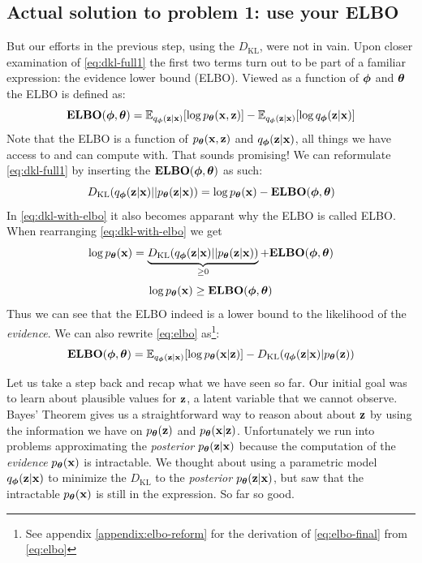 \documentclass[11pt]{article}
\theoremstyle{definition}
\begin{document}
\subsection{Actual solution to problem 1: use your ELBO}
But our efforts in the previous step, using the $D_{\text{KL}}$, were not in vain. Upon closer examination of \autoref{eq:dkl-full1} the first two terms turn out to be part of a familiar expression: the evidence lower bound (ELBO). Viewed as a function of $\boldsymbol{\phi}$ and $\boldsymbol{\theta}$ the ELBO is defined as:
\begin{equation}
	\mathbf{ELBO}(\boldsymbol{\phi}, \boldsymbol{\theta}) = \mathbb{E}_{q_{\boldsymbol{\phi}}(\mathbf{z}|\mathbf{x})}[\log p_{\boldsymbol{\theta}}(\mathbf{x},\mathbf{z})] - \mathbb{E}_{q_{\boldsymbol{\phi}}(\mathbf{z}|\mathbf{x})}[\log q_{\boldsymbol{\phi}}(\mathbf{z}|\mathbf{x})]
	\label{eq:elbo}
\end{equation}
Note that the ELBO is a function of $p_{\boldsymbol{\theta}}(\mathbf{x},\mathbf{z})$ and $q_{\boldsymbol{\phi}}(\mathbf{z}|\mathbf{x})$, all things we have access to and can compute with. That sounds promising! We can reformulate \autoref{eq:dkl-full1} by inserting the $\mathbf{ELBO}(\boldsymbol{\phi}, \boldsymbol{\theta})$ as such:
\begin{equation}
	D_{\text{KL}}(q_{\boldsymbol{\phi}}(\mathbf{z}|\mathbf{x})||p_{\boldsymbol{\theta}}(\mathbf{z}|\mathbf{x})) = \log p_{\boldsymbol{\theta}}(\mathbf{x}) - \mathbf{ELBO}(\boldsymbol{\phi}, \boldsymbol{\theta})
	\label{eq:dkl-with-elbo}
\end{equation}
In \autoref{eq:dkl-with-elbo} it also becomes apparant why the ELBO is called ELBO. When rearranging \autoref{eq:dkl-with-elbo} we get
\begin{equation}
	\log p_{\boldsymbol{\theta}}(\mathbf{x}) = \underbrace{D_{\text{KL}}(q_{\boldsymbol{\phi}}(\mathbf{z}|\mathbf{x})||p_{\boldsymbol{\theta}}(\mathbf{z}|\mathbf{x}))}_{\geq 0} + \mathbf{ELBO}(\boldsymbol{\phi}, \boldsymbol{\theta})
	\label{eq:elbo-as-lower-bound1}
\end{equation}
\begin{equation}
\log p_{\boldsymbol{\theta}}(\mathbf{x}) \geq \mathbf{ELBO}(\boldsymbol{\phi}, \boldsymbol{\theta})
\label{eq:elbo-as-lower-bound2}
\end{equation}
Thus we can see that the ELBO indeed is a lower bound to the likelihood of the \textit{evidence}. We can also rewrite \autoref{eq:elbo} as\footnote{See appendix \autoref{appendix:elbo-reform} for the derivation of \autoref{eq:elbo-final} from \autoref{eq:elbo}}:
\begin{equation}
	\mathbf{ELBO}(\boldsymbol{\phi}, \boldsymbol{\theta}) = \mathbb{E}_{q_{\boldsymbol{\phi}}(\mathbf{z}|\mathbf{x})}[\log p_{\boldsymbol{\theta}}(\mathbf{x}|\mathbf{z})] - D_{\text{KL}}(q_{\boldsymbol{\phi}}(\mathbf{z}|\mathbf{x})|p_{\boldsymbol{\theta}}(\mathbf{z}))
	\label{eq:elbo-final}
\end{equation}
\par 
Let us take a step back and recap what we have seen so far. Our initial goal was to learn about plausible values for $\mathbf{z}$, a latent variable that we cannot observe. Bayes' Theorem gives us a straightforward way to reason about about $\mathbf{z}$ by using the information we have on $p_{\boldsymbol{\theta}}(\mathbf{z})$ and $p_{\boldsymbol{\theta}}(\mathbf{x}|\mathbf{z})$. Unfortunately we run into problems approximating the \textit{posterior} $p_{\boldsymbol{\theta}}(\mathbf{z}|\mathbf{x})$ because the computation of the \textit{evidence} $p_{\boldsymbol{\theta}}(\mathbf{x})$ is intractable. We thought about using a parametric model $q_{\boldsymbol{\phi}}(\mathbf{z}|\mathbf{x})$ to minimize the $D_{\text{KL}}$ to the \textit{posterior} $p_{\boldsymbol{\theta}}(\mathbf{z}|\mathbf{x})$, but saw that the intractable $p_{\boldsymbol{\theta}}(\mathbf{x})$ is still in the expression. So far so good. 
\end{document}
